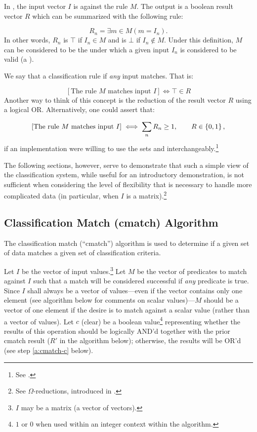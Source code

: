 In , the input vector $I$ is  against the
rule $M$. The output is a boolean result vector $R$ which can be summarized with
the following rule:

$$
  R_n = \exists m\in M(m = I_n).
$$
\noindent
In other words, $R_n$ is $\top$ if $I_n\in M$ and is $\bot$ if $I_n\notin M$.
Under this definition, $M$ can be considered to be the  under which
a given input $I_n$ is considered to be valid (a ).

We say that a classification rule  if \emph{any} input matches.
That is:

$$
  \left[\textrm{The rule $M$ matches input $I$}\right]
  \iff
  \top\in R
$$
\noindent
Another way to think of this concept is the reduction of the result vector $R$
using a logical OR. Alternatively, one could assert that:

$$
  \left[\textrm{The rule $M$ matches input $I$}\right]
  \iff
  \sum\limits_n R_n \geq 1, \qquad R \in \set{0,1},
$$
\noindent
if an implementation were willing to use the sets \boolset and 
interchangeably.\footnote{See .}

The following sections, however, serve to demonstrate that such a simple view of
the classification system, while useful for an introductory demonstration, is
not sufficient when considering the level of flexibility that is necessary to
handle more complicated data (in particular, when $I$ is a
matrix).\footnote{See $\Omega$-reductions, introduced in
.}



\subsection{Classification Match (cmatch) Algorithm}
\label{a:cmatch}

The classification match (``cmatch'') algorithm is used to determine if a given
set of data matches a given set of classification criteria.

Let $I$ be the vector of input values.\footnote{$I$ may be a matrix (a vector
of vectors).} Let $M$ be the vector of predicates to match against $I$ such
that a match will be considered successful if \emph{any} predicate is true.
Since $I$ shall always be a vector of values---even if the vector contains only
one element (see algorithm below for comments on scalar values)---$M$ should be
a vector of one element if the desire is to match against a scalar value (rather
than a vector of values). Let $c$ (clear) be a boolean value\footnote{$1$ or $0$
when used within an integer context within the algorithm.} representing whether
the results of this operation should be logically AND'd together with the
prior cmatch result ($R'$ in the algorithm below); otherwise, the results will
be OR'd (see step \ref{a:cmatch-c} below).

